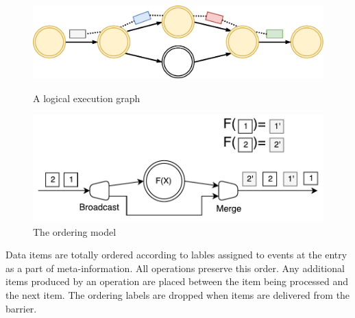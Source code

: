 \begin{figure}[ht]
  \centering
  \begin{minipage}[b]{.5\textwidth}
    \centering
    \includegraphics[width=0.9\linewidth]{pics/logical-graph}
    \caption{A logical execution  graph}
    \label{logical-graph-figure}
  \end{minipage}%
  \begin{minipage}[b]{.5\textwidth}
    \centering
    \includegraphics[width=\linewidth]{pics/ordering}
    \caption{The ordering model}
    \label{ordering}
  \end{minipage}
\end{figure}


Data items are totally ordered according to lables assigned to events at the entry as a part of meta-information. All operations preserve this order. Any additional items produced by an operation are placed between the item being processed and the next item. The ordering labels are dropped when items are delivered from the barrier. 


